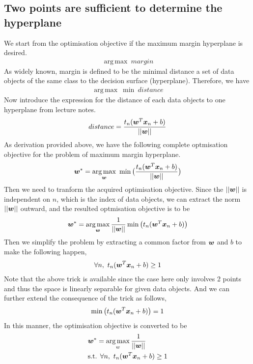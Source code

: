 \documentclass[11pt,a4paper]{article}
\newcommand{\htab}{\hspace*{0.63cm}}
\DeclareMathOperator*{\argmax}{arg\,max}
\begin{document}
\subsection{Two points are sufficient to determine the hyperplane}
\htab We start from the optimisation objective if the maximum margin hyperplane is desired.
\begin{align}
    \argmax \ margin
    \end{align}
\htab As widely known, margin is defined to be the minimal distance a set of data objects of the same class
to the decision surface (hyperplane). Therefore, we have
\begin{align}
    \argmax\ \min \ distance
    \end{align}
\htab Now introduce the expression for the distance of each data objects to one hyperplane from lecture notes.
\begin{align}
    distance = \frac{t_{n} (\boldsymbol{w}^{T} \boldsymbol{x}_{n} + b )}{||\boldsymbol{w}||}
    \end{align}
\htab As derivation provided above, we have the following complete optmisation objective for the problem
of maximum margin hyperplane. 
\begin{align}
    \ws = \argmax_{\w}\ \min \big( \frac{\tmargin}{||\w||}\big)
    \end{align}
\htab Then we need to tranform the acquired optimisation objective. Since the $||\boldsymbol{w}||$ is independent on $n$, 
which is the index of data objects, we can extract the norm $||\boldsymbol{w}||$ outward, and the resulted 
optmisation objective is to be
\begin{align}
    \ws = \argmax_{\w} \frac{1}{||\w||} \min \big( \tmargin \big)
    \end{align}
\htab Then we simplify the problem by extracting a common factor from $\boldsymbol{w}$ and $b$ to make the following happen,
\begin{align}
    \forall n,\ t_{n} (\boldsymbol{w}^{T} \boldsymbol{x}_{n} + b ) \geq 1 
    \end{align}
\htab Note that the above trick is available since the case here only involves 2 points and thus 
the space is linearly separable for given data objects. And we can further extend the 
consequence of the trick as follows,
\begin{align}
      \min \big( t_{n} (\boldsymbol{w}^{T} \boldsymbol{x}_{n} + b ) \big) = 1 
    \end{align}
\htab In this manner, the optimisation objective is converted to be 
\begin{align}
    &\ws = \argmax_{w} \frac{1}{||\w||} \\
    &\text{s.t. $\forall n,\ \tmargin \geq 1$} \nonumber
    \end{align}
\end{document}
